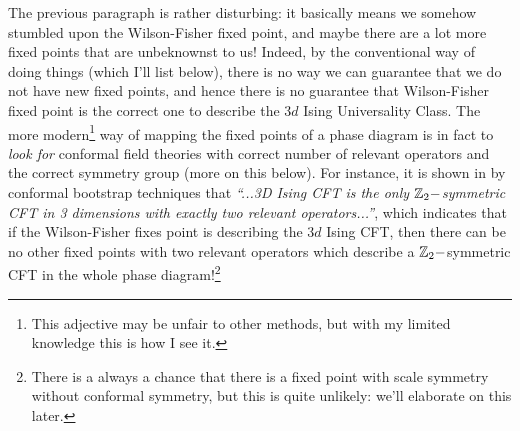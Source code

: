 \documentclass[12pt]{article}
\numberwithin{equation}{section}
\begin{document}
The previous paragraph is rather disturbing: it basically means we somehow stumbled upon the Wilson-Fisher fixed point, and maybe there are a lot more fixed points that are unbeknownst to us! Indeed, by the conventional way of doing things (which I'll list below), there is no way we can guarantee that we do not have new fixed points, and hence there is no guarantee that Wilson-Fisher fixed point is the correct one to describe the $3d$ Ising Universality Class. The more modern\footnote{This adjective may be unfair to other methods, but with my limited knowledge this is how I see it.} way of mapping the fixed points of a phase diagram is in fact to \emph{look for} conformal field theories with correct number of relevant operators and the correct symmetry group (more on this below). For instance, it is shown in \cite{Kos:2014bka} by conformal bootstrap techniques that \emph{``...3D Ising CFT is the only $\mathbb{Z}_2-$symmetric CFT in 3 dimensions with exactly two relevant operators...''}, which indicates that if the Wilson-Fisher fixes point is describing the $3d$ Ising CFT, then there can be no other fixed points with two relevant operators which describe a $\mathbb{Z}_2-$symmetric CFT in the whole phase diagram!\footnote{There is a always a chance that there is a fixed point with scale symmetry without conformal symmetry, but this is quite unlikely: we'll elaborate on this later.}
\end{document}
